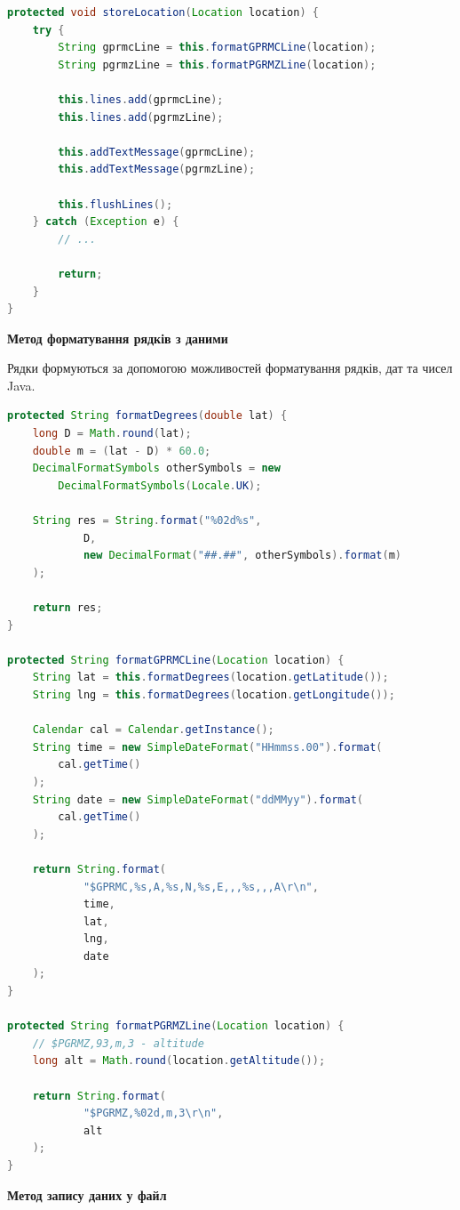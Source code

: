 \documentclass[simple,a4paper,14pt,ukrainian,utf8]{eskdtext}
\begin{document}
\begin{lstlisting}[language=Java]
protected void storeLocation(Location location) {
    try {
        String gprmcLine = this.formatGPRMCLine(location);
        String pgrmzLine = this.formatPGRMZLine(location);

        this.lines.add(gprmcLine);
        this.lines.add(pgrmzLine);

        this.addTextMessage(gprmcLine);
        this.addTextMessage(pgrmzLine);

        this.flushLines();
    } catch (Exception e) {
        // ...

        return;
    }
}
\end{lstlisting}
        	
        	\textbf{Метод форматування рядків з даними}
        	
        	Рядки формуються за допомогою можливостей форматування рядків, дат та чисел Java.
        	
\begin{lstlisting}[language=Java]
protected String formatDegrees(double lat) {
    long D = Math.round(lat);
    double m = (lat - D) * 60.0;
    DecimalFormatSymbols otherSymbols = new 
    	DecimalFormatSymbols(Locale.UK);

    String res = String.format("%02d%s",
            D,
            new DecimalFormat("##.##", otherSymbols).format(m)
    );

    return res;
}

protected String formatGPRMCLine(Location location) {
    String lat = this.formatDegrees(location.getLatitude());
    String lng = this.formatDegrees(location.getLongitude());

    Calendar cal = Calendar.getInstance();
    String time = new SimpleDateFormat("HHmmss.00").format(
    	cal.getTime()
    );
    String date = new SimpleDateFormat("ddMMyy").format(
    	cal.getTime()
    );

    return String.format(
            "$GPRMC,%s,A,%s,N,%s,E,,,%s,,,A\r\n",
            time,
            lat,
            lng,
            date
    );
}

protected String formatPGRMZLine(Location location) {
    // $PGRMZ,93,m,3 - altitude
    long alt = Math.round(location.getAltitude());

    return String.format(
            "$PGRMZ,%02d,m,3\r\n",
            alt
    );
}
\end{lstlisting}
        	
        	\textbf{Метод запису даних у файл}
        	
\end{document}
